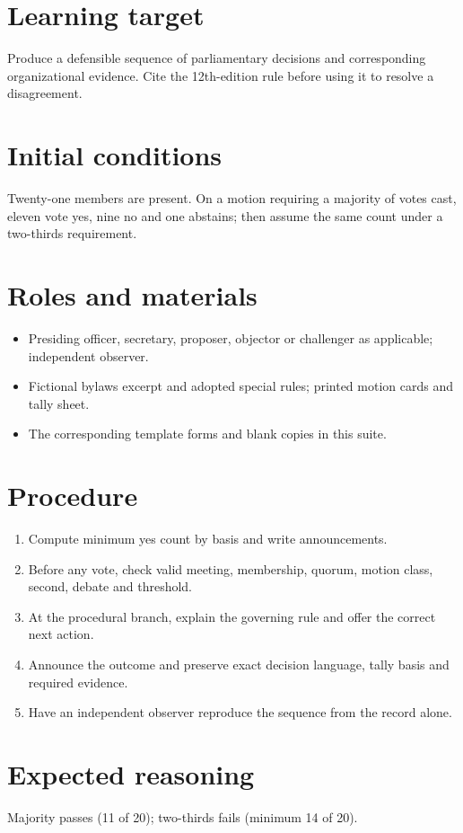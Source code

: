 \documentclass[11pt]{article}
\begin{document}
\SuiteOpen
\section{Learning target}
Produce a defensible sequence of parliamentary decisions and corresponding organizational evidence. Cite the 12th-edition rule before using it to resolve a disagreement.

\section{Initial conditions}
Twenty-one members are present. On a motion requiring a majority of votes cast, eleven vote yes, nine no and one abstains; then assume the same count under a two-thirds requirement.

\section{Roles and materials}
\begin{itemize}[leftmargin=*,itemsep=4pt]
\item Presiding officer, secretary, proposer, objector or challenger as applicable; independent observer.
\item Fictional bylaws excerpt and adopted special rules; printed motion cards and tally sheet.
\item The corresponding template forms and blank copies in this suite.
\end{itemize}

\section{Procedure}
\begin{enumerate}[leftmargin=*,itemsep=4pt]
\item Compute minimum yes count by basis and write announcements.
\item Before any vote, check valid meeting, membership, quorum, motion class, second, debate and threshold.
\item At the procedural branch, explain the governing rule and offer the correct next action.
\item Announce the outcome and preserve exact decision language, tally basis and required evidence.
\item Have an independent observer reproduce the sequence from the record alone.
\end{enumerate}

\section{Expected reasoning}
Majority passes (11 of 20); two-thirds fails (minimum 14 of 20).
\end{document}
